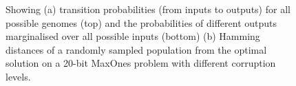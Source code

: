 \documentclass[runningheads,a4paper]{llncs}
\begin{document}
\begin{figure}[!]
\vspace{-0.375in}

\centering
{}
\caption[Optional caption for list of figures]{ Showing (a) transition probabilities (from inputs to outputs) for all possible genomes (top) and the probabilities of different outputs marginalised over all possible inputs (bottom)  (b) Hamming distances of a randomly sampled population from the optimal solution on a 20-bit MaxOnes problem with different corruption levels.}
\label{figure:experiment_subplots}
\end{figure}
\end{document}
